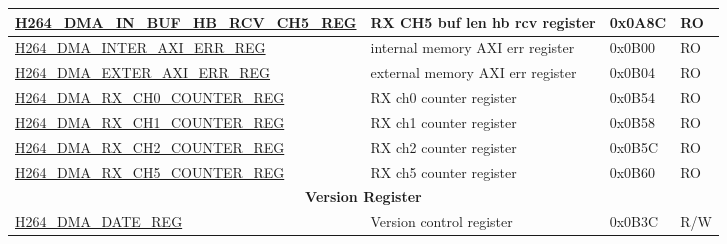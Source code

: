 \begin{longtable}{ | p{7.5cm} | p{5.7cm} | p{1.2cm} | p{1.5cm} | }
\hyperref[regdesc:H264DMAINBUFHBRCVCH5REG]{H264\_DMA\_IN\_BUF\_HB\_RCV\_CH5\_REG} & RX CH5 buf len hb rcv register & 0x0A8C & RO \\ \hline
\hyperref[regdesc:H264DMAINTERAXIERRREG]{H264\_DMA\_INTER\_AXI\_ERR\_REG} & internal memory AXI err register & 0x0B00 & RO \\ \hline
\hyperref[regdesc:H264DMAEXTERAXIERRREG]{H264\_DMA\_EXTER\_AXI\_ERR\_REG} & external memory AXI err register & 0x0B04 & RO \\ \hline
\hyperref[regdesc:H264DMARXCH0COUNTERREG]{H264\_DMA\_RX\_CH0\_COUNTER\_REG} & RX ch0 counter register & 0x0B54 & RO \\ \hline
\hyperref[regdesc:H264DMARXCH1COUNTERREG]{H264\_DMA\_RX\_CH1\_COUNTER\_REG} & RX ch1 counter register & 0x0B58 & RO \\ \hline
\hyperref[regdesc:H264DMARXCH2COUNTERREG]{H264\_DMA\_RX\_CH2\_COUNTER\_REG} & RX ch2 counter register & 0x0B5C & RO \\ \hline
\hyperref[regdesc:H264DMARXCH5COUNTERREG]{H264\_DMA\_RX\_CH5\_COUNTER\_REG} & RX ch5 counter register & 0x0B60 & RO \\ \hline

\multicolumn{4}{|c|}{\cellcolor{gray!15}\textbf{Version Register}} \\ \hline
\hyperref[regdesc:H264DMADATEREG]{H264\_DMA\_DATE\_REG} & Version control register & 0x0B3C & R/W \\ \hline
\end{longtable}
